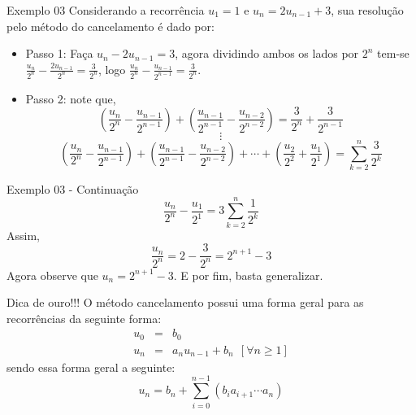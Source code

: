 \begin{frame}{Exemplo 03}
  Considerando a recorrência $u_1 = 1$ e $u_{n} = 2u_{n - 1} + 3$, sua resolução pelo método do cancelamento é dado por:
  \pause
  \begin{itemize}
    \item Passo 1: Faça $u_n - 2u_{n - 1} = 3$, agora dividindo ambos os lados por $2^n$ tem-se $\frac{u_n}{2^n}- \frac{2u_{n - 1}}{2^n} = \frac{3}{2^n}$, logo $\frac{u_n}{2^n}- \frac{u_{n - 1}}{2^{n-1}} = \frac{3}{2^n}$.
    \item Passo 2: note que,\pause
    $$(\frac{u_n}{2^n} - \frac{u_{n - 1}}{2^{n-1}}) + (\frac{u_{n - 1}}{2^{n-1}} - \frac{u_{n - 2}}{2^{n-2}})  = \frac{3}{2^n} + \frac{3}{2^{n-1}}$$\pause
    $$\vdots$$
    $$(\frac{u_n}{2^n} - \frac{u_{n - 1}}{2^{n-1}}) + (\frac{u_{n - 1}}{2^{n-1}} - \frac{u_{n - 2}}{2^{n-2}}) + \cdots + (\frac{u_2}{2^2} + \frac{u_1}{2^1}) = \sum_{k = 2}^{n}\frac{3}{2^k}$$
  \end{itemize}
\end{frame}

\begin{frame}{Exemplo 03 - Continuação}
  $$\frac{u_n}{2^n} - \frac{u_1}{2^1} = 3 \sum_{k = 2}^{n}\frac{1}{2^k}$$\pause
  Assim, 
  $$\frac{u_n}{2^n} = 2 - \frac{3}{2^n} = 2^{n+1} - 3$$\pause
  Agora observe que $u_n = 2^{n+1} - 3$. E por fim, basta generalizar.
\end{frame}

\begin{frame}{Dica de ouro!!!}
  O método cancelamento possui uma forma geral para as recorrências da seguinte forma:
  \begin{eqnarray*}
    u_0 & = & b_0\\
    u_n & = & a_n u_{n-1} + b_n \ \ [\forall n \geq 1]
  \end{eqnarray*}
  sendo essa forma geral a seguinte:
  $$u_n = b_n + \sum_{i = 0}^{n-1} (b_i a_{i+1}\cdots a_n)$$
\end{frame}
